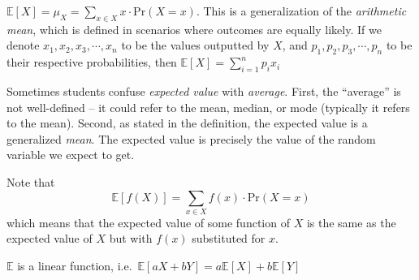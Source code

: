 \documentclass[main.tex]{subfiles}
\begin{document}
\begin{defn}
	\(\mathbb{E}[X] = \mu_X = \sum_{x \in X} x \cdot \mathrm{Pr}(X = x)\). This is a generalization of the \textit{arithmetic mean}, which is defined in scenarios where outcomes are equally likely. If we denote \(x_1, x_2, x_3, \cdots, x_n\) to be the values outputted by \(X\), and \(p_1, p_2, p_3, \cdots, p_n\) to be their respective probabilities, then \(\mathbb{E}[X] = \sum_{i=1}^{n} p_i x_i\)
\end{defn}

Sometimes students confuse \textit{expected value} with \textit{average}. First, the ``average'' is not well-defined -- it could refer to the mean, median, or mode (typically it refers to the mean). Second, as stated in the definition, the expected value is a generalized \textit{mean}. The expected value is precisely the value of the random variable we expect to get.

Note that \[\mathbb{E}[f(X)] = \sum_{x \in X} f(x) \cdot \mathrm{Pr}(X = x)\] which means that the expected value of some function of \(X\) is the same as the expected value of \(X\) but with \(f(x)\) substituted for \(x\).

\begin{prop}
	\(\mathbb{E}\) is a linear function, i.e.\ \(\mathbb{E}[aX+bY] = a\mathbb{E}[X] + b\mathbb{E}[Y]\)
\end{prop}
\end{document}
